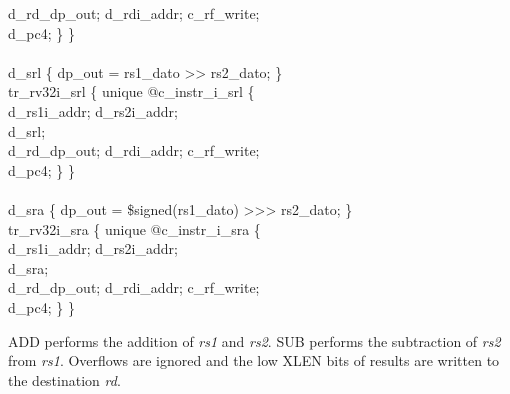 {\indent \hspace{\parindent} d\_rd\_dp\_out; d\_rdi\_addr; c\_rf\_write;  \\%
\indent \hspace{\parindent} d\_pc4; \} \} \\%
\\
\indent d\_srl \{ dp\_out = rs1\_dato >> rs2\_dato; \}\\%
\indent tr\_rv32i\_srl \{ unique @c\_instr\_i\_srl \{ \\%
\indent \hspace{\parindent} d\_rs1i\_addr; d\_rs2i\_addr; \\%
\indent \hspace{\parindent} d\_srl; \\%
\indent \hspace{\parindent} d\_rd\_dp\_out; d\_rdi\_addr; c\_rf\_write;  \\%
\indent \hspace{\parindent} d\_pc4; \} \} \\%
\\
\indent d\_sra \{ dp\_out = \$signed(rs1\_dato) >>> rs2\_dato; \}\\%
\indent tr\_rv32i\_sra \{ unique @c\_instr\_i\_sra \{ \\%
\indent \hspace{\parindent} d\_rs1i\_addr; d\_rs2i\_addr; \\%
\indent \hspace{\parindent} d\_sra; \\%
\indent \hspace{\parindent} d\_rd\_dp\_out; d\_rdi\_addr; c\_rf\_write;  \\%
\indent \hspace{\parindent} d\_pc4; \} \} \\%
}

ADD performs the addition of {\em rs1} and {\em rs2}. SUB performs the
subtraction of {\em rs2} from {\em rs1}.  Overflows are ignored and the low XLEN
bits of results are written to the destination {\em rd}.

